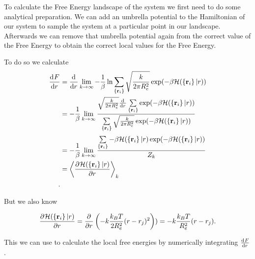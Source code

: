 \documentclass[../main.tex]{subfiles}
\begin{document}
To calculate the Free Energy landscape of the system we first need to do some analytical preparation.
We can add an umbrella potential to the Hamiltonian of our system to sample the system at a particular point in our landscape.
Afterwards we can remove that umbrella potential again from the correct value of the Free Energy to obtain the correct local values for the Free Energy. 
\par

To do so we calculate 
\begin{align*}
    \dv[]{F}{r} &= \dv[]{}{r} 
    \lim\limits_{k \to \infty} 
    -\frac{1}{\beta} 
    \ln 
    \sum\limits_{\left\{ \mathbf{r}_i \right\} }^{} 
    \sqrt{\frac{k}{2 \pi R_e^2}} 
    \exp( -  \beta\mathcal{H}(\left\{ \mathbf{r} _i \right\} | r ) ) \\
    &= 
    -\frac{1}{\beta} 
    \lim\limits_{k \to \infty}
    \frac{
        \sqrt{\frac{k}{2 \pi R_e^2}} 
        \dv[]{}{r} 
        \sum\limits_{\left\{ \mathbf{r}_i \right\} }^{} 
        \exp( -  \beta\mathcal{H}(\left\{ \mathbf{r} _i \right\} | r ) )
    }{
        \sum\limits_{\left\{ \mathbf{r}_i \right\} }^{} 
        \sqrt{\frac{k}{2 \pi R_e^2}} 
        \exp( -  \beta\mathcal{H}(\left\{ \mathbf{r} _i \right\} | r ) )
    }
    \\
    &= 
    -\frac{1}{\beta} 
    \lim\limits_{k \to \infty}
    \frac{
        \sum\limits_{\left\{ \mathbf{r}_i \right\} }^{} 
        - \beta\mathcal{H}(\left\{ \mathbf{r} _i \right\} | r )
        \exp( -  \beta\mathcal{H}(\left\{ \mathbf{r} _i \right\} | r ) )
    }{
        Z_k
    }
    \\
    &= 
    \left< 
    \pdv[]{
        \mathcal{H}(\left\{ \mathbf{r} _i \right\} | r )
    }{r} 
    \right>_k
    \\
.\end{align*}

But we also know 

\[
    \pdv[]{
        \mathcal{H}(\left\{ \mathbf{r} _i \right\} | r )
    }{r} 
    = 
    \pdv[]{}{r} \left( 
        -k \frac{k_B T}{2R_e^2} (r- r_j)^2
    \right) )
    = 
    -k \frac{k_B T}{R_e^2} (r- r_j)
.\] 

This we can use to calculate the local free energies by numerically integrating $\dv[]{F}{r} $.



\ifSubfilesClassLoaded{
}{
    \newpage
}
\end{document}
